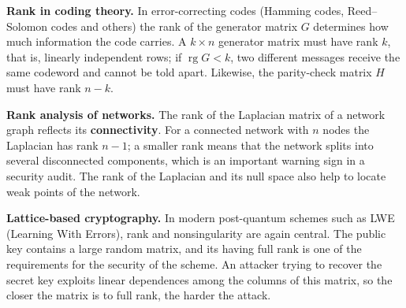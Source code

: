 \textbf{Rank in coding theory.}
In error-correcting codes (Hamming codes, Reed–Solomon codes and others) the
rank of the generator matrix $G$ determines how much information the code
carries. A $k\times n$ generator matrix must have rank $k$, that is,
linearly independent rows; if $\operatorname{rg}G < k$, two different
messages receive the same codeword and cannot be told apart. Likewise, the
parity-check matrix $H$ must have rank $n-k$.

\textbf{Rank analysis of networks.}
The rank of the Laplacian matrix of a network graph reflects its
\textbf{connectivity}. For a connected network with $n$ nodes the Laplacian
has rank $n-1$; a smaller rank means that the network splits into several
disconnected components, which is an important warning sign in a security
audit. The rank of the Laplacian and its null space also help to locate weak
points of the network.

\textbf{Lattice-based cryptography.}
In modern post-quantum schemes such as LWE (Learning With Errors), rank and
nonsingularity are again central. The public key contains a large random
matrix, and its having full rank is one of the requirements for the security
of the scheme. An attacker trying to recover the secret key exploits linear
dependences among the columns of this matrix, so the closer the matrix is to
full rank, the harder the attack.

